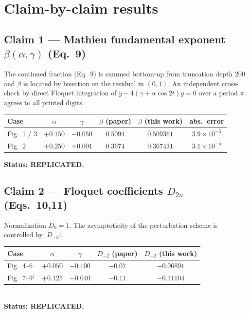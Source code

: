\documentclass[11pt]{article}
\newcommand{\repl}{\textcolor{repgreen}{\textbf{REPLICATED}}}
\begin{document}
\section{Claim-by-claim results}

\subsection{Claim 1 --- Mathieu fundamental exponent \texorpdfstring{$\beta(\alpha,\gamma)$}{beta} (Eq.~9)}
The continued fraction (Eq.~9) is summed bottom-up from truncation depth 200 and $\beta$ is
located by bisection on the residual in $(0,1)$. An independent cross-check by direct Floquet
integration of $\ddot y - 4(\gamma+\alpha\cos 2t)y = 0$ over a period $\pi$ agrees to all
printed digits.

\begin{center}
\begin{tabular}{@{}lccccc@{}}
\toprule
Case & $\alpha$ & $\gamma$ & $\beta$ (paper) & $\beta$ (this work) & abs.\ error\\
\midrule
Fig.\ 1 / 3 & $+0.150$ & $-0.050$ & $0.5094$ & $0.509361$ & $3.9\times10^{-5}$\\
Fig.\ 2     & $+0.250$ & $+0.001$ & $0.3674$ & $0.367431$ & $3.1\times10^{-5}$\\
\bottomrule
\end{tabular}
\end{center}
\noindent\textbf{Status: \repl.}

\subsection{Claim 2 --- Floquet coefficients \texorpdfstring{$D_{2n}$}{D2n} (Eqs.~10,11)}
Normalization $D_0=1$. The asymptoticity of the perturbation scheme is controlled by
$|D_{-2}|$.
\begin{center}
\begin{tabular}{@{}lcccc@{}}
\toprule
Case & $\alpha$ & $\gamma$ & $D_{-2}$ (paper) & $D_{-2}$ (this work)\\
\midrule
Fig.\ 4--6 & $+0.050$ & $-0.100$ & $-0.07$ & $-0.06891$\\
Fig.\ 7--9$^\dagger$ & $+0.125$ & $-0.040$ & $-0.11$ & $-0.11104$\\
\bottomrule
\end{tabular}
\end{center}
\\
\textbf{Status: \repl.}
\end{document}
